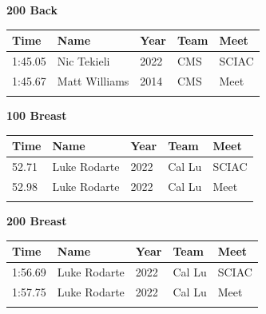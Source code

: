 \vspace{1.2em}
\noindent\begin{minipage}[t]{0.98\textwidth}
\centering
\textbf{\textcolor{teamprimary}{200 Back}}\par
\vspace{0.5em}
\centering
\small
\renewcommand{\arraystretch}{1.0}
\setlength{\tabcolsep}{4pt}
\begin{tabular}{@{}p{2.5cm}p{4.5cm}p{1.5cm}p{2.5cm}p{2.5cm}@{}}
\toprule
\textbf{Time} & \textbf{Name} & \textbf{Year} & \textbf{Team} & \textbf{Meet} \\
\midrule
1:45.05 & Nic Tekieli & 2022 & CMS & SCIAC \\
1:45.67 & Matt Williams & 2014 & CMS & Meet \\
\bottomrule
\vspace{0.5em}
\end{tabular}
\end{minipage}
\vspace{1.2em}
\noindent\begin{minipage}[t]{0.98\textwidth}
\centering
\textbf{\textcolor{teamprimary}{100 Breast}}\par
\vspace{0.5em}
\centering
\small
\renewcommand{\arraystretch}{1.0}
\setlength{\tabcolsep}{4pt}
\begin{tabular}{@{}p{2.5cm}p{4.5cm}p{1.5cm}p{2.5cm}p{2.5cm}@{}}
\toprule
\textbf{Time} & \textbf{Name} & \textbf{Year} & \textbf{Team} & \textbf{Meet} \\
\midrule
52.71 & Luke Rodarte & 2022 & Cal Lu & SCIAC \\
52.98 & Luke Rodarte & 2022 & Cal Lu & Meet \\
\bottomrule
\vspace{0.5em}
\end{tabular}
\end{minipage}
\vspace{1.2em}
\noindent\begin{minipage}[t]{0.98\textwidth}
\centering
\textbf{\textcolor{teamprimary}{200 Breast}}\par
\vspace{0.5em}
\centering
\small
\renewcommand{\arraystretch}{1.0}
\setlength{\tabcolsep}{4pt}
\begin{tabular}{@{}p{2.5cm}p{4.5cm}p{1.5cm}p{2.5cm}p{2.5cm}@{}}
\toprule
\textbf{Time} & \textbf{Name} & \textbf{Year} & \textbf{Team} & \textbf{Meet} \\
\midrule
1:56.69 & Luke Rodarte & 2022 & Cal Lu & SCIAC \\
1:57.75 & Luke Rodarte & 2022 & Cal Lu & Meet \\
\bottomrule
\vspace{0.5em}
\end{tabular}
\end{minipage}
